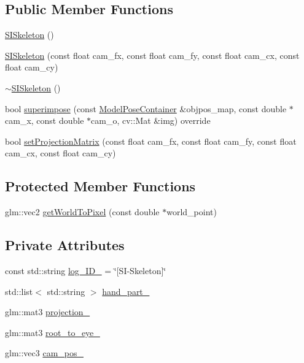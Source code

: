 \subsection*{Public Member Functions}
\begin{DoxyCompactItemize}
\item 
\mbox{\hyperlink{classSISkeleton_a52ad426ff55dacaea6fb30470a7e67ff}{S\+I\+Skeleton}} ()
\item 
\mbox{\hyperlink{classSISkeleton_a3d968efd0700f20a93064957f15bf40e}{S\+I\+Skeleton}} (const float cam\+\_\+fx, const float cam\+\_\+fy, const float cam\+\_\+cx, const float cam\+\_\+cy)
\item 
\mbox{\hyperlink{classSISkeleton_a6e9f780999700a4695d4ed487f2499b9}{$\sim$\+S\+I\+Skeleton}} ()
\item 
bool \mbox{\hyperlink{classSISkeleton_a3f49fa3419370c2597435768f280c747}{superimpose}} (const \mbox{\hyperlink{classSuperimpose_a178e3d4e2def6635bfcf9454dd4b5d22}{Model\+Pose\+Container}} \&objpos\+\_\+map, const double $\ast$cam\+\_\+x, const double $\ast$cam\+\_\+o, cv\+::\+Mat \&img) override
\item 
bool \mbox{\hyperlink{classSISkeleton_aa1f5e1a67363038821a5d514fb361a38}{set\+Projection\+Matrix}} (const float cam\+\_\+fx, const float cam\+\_\+fy, const float cam\+\_\+cx, const float cam\+\_\+cy)
\end{DoxyCompactItemize}
\subsection*{Protected Member Functions}
\begin{DoxyCompactItemize}
\item 
glm\+::vec2 \mbox{\hyperlink{classSISkeleton_adbd224633ac2e4c0285cf2cf760cc42a}{get\+World\+To\+Pixel}} (const double $\ast$world\+\_\+point)
\end{DoxyCompactItemize}
\subsection*{Private Attributes}
\begin{DoxyCompactItemize}
\item 
const std\+::string \mbox{\hyperlink{classSISkeleton_a6d4a9061880520792f467eb8e7faa66b}{log\+\_\+\+I\+D\+\_\+}} = \char`\"{}\mbox{[}SI-\/Skeleton\mbox{]}\char`\"{}
\item 
std\+::list$<$ std\+::string $>$ \mbox{\hyperlink{classSISkeleton_ae88bbaec338923a85f4afbf8704a6933}{hand\+\_\+part\+\_\+}}
\item 
glm\+::mat3 \mbox{\hyperlink{classSISkeleton_a1ac569493d56bf099bdc364318ad5622}{projection\+\_\+}}
\item 
glm\+::mat3 \mbox{\hyperlink{classSISkeleton_a476442a8c9e9a1f4a703c3a84f0b83f1}{root\+\_\+to\+\_\+eye\+\_\+}}
\item 
glm\+::vec3 \mbox{\hyperlink{classSISkeleton_a63f1395d3e57e2d6a6d7de50928221a2}{cam\+\_\+pos\+\_\+}}
\end{DoxyCompactItemize}


